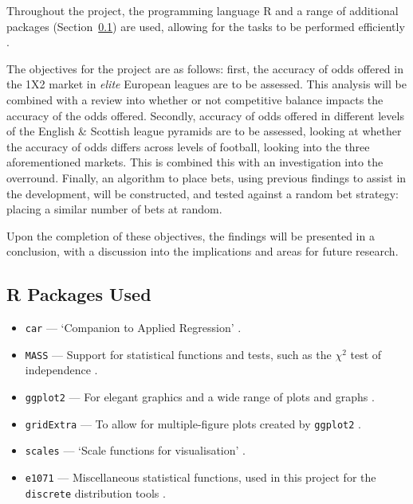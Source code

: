 \documentclass[a4paper,10pt]{report}
\begin{document}
Throughout the project, the programming language R and a range of additional packages (Section~\ref{ssec:rpackages}) are used, allowing for the tasks to be performed efficiently \autocite{rProgram}. \vspace{3mm} 

The objectives for the project are as follows: first, the accuracy of odds offered in the 1X2 market in \textit{elite} European leagues are to be assessed. This analysis will be combined with a review into whether or not competitive balance impacts the accuracy of the odds offered. Secondly, accuracy of odds offered in different levels of the English \& Scottish league pyramids are to be assessed, looking at whether the accuracy of odds differs across levels of football, looking into the three aforementioned markets. This is combined this with an investigation into the overround. Finally, an algorithm to place bets, using previous findings to assist in the development, will be constructed, and tested against a random bet strategy: placing a similar number of bets at random. \vspace{3mm}

Upon the completion of these objectives, the findings will be presented in a conclusion, with a discussion into the implications and areas for future research.


\subsection{R Packages Used}\label{ssec:rpackages}
\begin{itemize}
\item \lstinline|car| --- `Companion to Applied Regression' \autocite{carPackage}.
\item \lstinline|MASS| --- Support for statistical functions and tests, such as the $\chi^2$ test of independence \autocite{massPackage}.
\item \lstinline|ggplot2| --- For elegant graphics and a wide range of plots and graphs \autocite{ggplot2Package}.
\item \lstinline|gridExtra| --- To allow for multiple-figure plots created by \lstinline|ggplot2| \autocite{gridExtraPackage}.
\item \lstinline|scales| --- `Scale functions for visualisation' \autocite{scalesPackage}.
\item \lstinline|e1071| --- Miscellaneous statistical functions, used in this project for the \lstinline|discrete| distribution tools \autocite{e1071Package}.
\end{itemize}
\end{document}
